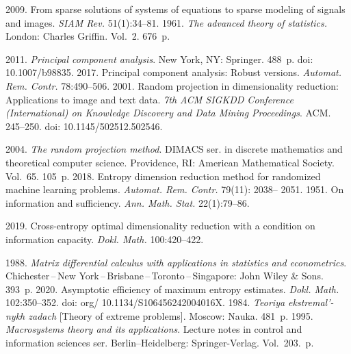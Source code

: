   \begin{multicols}{2}

\renewcommand{\bibname}{\protect\rmfamily References}

{\small\frenchspacing
 {%
 \begin{thebibliography}{99}

 2009. From sparse solutions of systems of 
equations to sparse modeling of signals and images. \textit{SIAM Rev.}
 51(1):34--81.
 1961. \textit{The advanced theory of statistics.} 
London: Charles Griffin.  Vol.~2. 676~p.

\columnbreak


 2011. \textit{Principal component analysis}. New York, NY: Springer. 488~p. 
doi: 10.1007/b98835.
 2017. Principal component analysis: Robust versions. 
\textit{Automat. Rem. Contr.} 78:490--506.
 2001. Random projection in dimensionality reduction: 
Applications to image and text data. \textit{7th ACM SIGKDD Conference (International) on 
Knowledge Discovery and Data Mining Proceedings}. ACM. 245--250. doi: 10.1145/502512.502546.

 2004. \textit{The random projection method}. \mbox{DIMACS} ser. in discrete 
mathematics and theoretical computer science.
Providence, RI: 
American Mathematical Society. Vol.~65. 105~p. 
 2018. Entropy dimension reduction 
method for randomized machine learning problems. \textit{Automat. Rem. Contr.} 79(11): 2038--
2051. 
 1951. On information and sufficiency. \textit{Ann. 
Math. Stat.} 22(1):79--86.


 2019. Cross-entropy optimal dimensionality reduction 
with a condition on information capacity. \textit{Dokl. Math.}
 100:420--422.
 
 \columnbreak
 
 1988. \textit{Matrix differential calculus with 
applications in statistics and econometrics}. 
Chichester\,--\,New York\,--\,Brisbane\,--\,Toronto\,--\,Singapore: John Wiley \& Sons. 393~p.
 2020.
 Asymptotic efficiency of maximum entropy estimates. \textit{Dokl. Math.} 102:350--352.
 doi: org/ 10.1134/S106456242004016X.
 1984. \textit{Teoriya eks\-tre\-mal'-nykh zadach} [Theory 
of extreme problems]. Moscow: Nauka. 481~p.
 1995. \textit{Macrosystems theory and its applications}.
Lecture notes 
in control and information sciences ser.
 Berlin--Heidelberg: Springer-Verlag. Vol.~203.~p.
 

\end{thebibliography}}}
\end{multicols}
